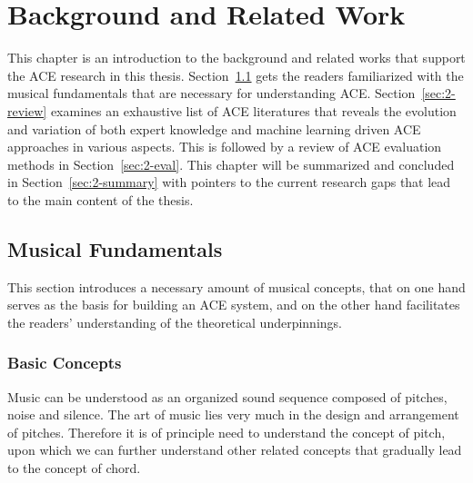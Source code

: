 


\chapter{Background and Related Work}\label{cp:background} %


This chapter is an introduction to the background and related works that support the ACE research in this thesis. Section~\ref{sec:2-fund} gets the readers familiarized with the musical fundamentals that are necessary for understanding ACE. Section~\ref{sec:2-review} examines an exhaustive list of ACE literatures that reveals the evolution and variation of both expert knowledge and machine learning driven ACE approaches in various aspects. This is followed by a review of ACE evaluation methods in Section~\ref{sec:2-eval}. This chapter will be summarized and concluded in Section~\ref{sec:2-summary} with pointers to the current research gaps that lead to the main content of the thesis.




\section{Musical Fundamentals} \label{sec:2-fund}
This section introduces a necessary amount of musical concepts, that on one hand serves as the basis for building an ACE system, and on the other hand facilitates the readers' understanding of the theoretical underpinnings.


\subsection{Basic Concepts}
Music can be understood as an organized sound sequence composed of pitches, noise and silence. The art of music lies very much in the design and arrangement of pitches. Therefore it is of principle need to understand the concept of pitch, upon which we can further understand other related concepts that gradually lead to the concept of chord.

